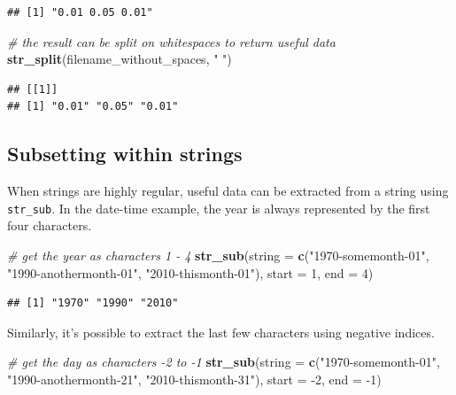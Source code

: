 \documentclass[]{book}
\newenvironment{Shaded}{}{}
\newcommand{\CommentTok}[1]{\textcolor[rgb]{0.38,0.63,0.69}{\textit{#1}}}
\newcommand{\DataTypeTok}[1]{\textcolor[rgb]{0.56,0.13,0.00}{#1}}
\newcommand{\DecValTok}[1]{\textcolor[rgb]{0.25,0.63,0.44}{#1}}
\newcommand{\KeywordTok}[1]{\textcolor[rgb]{0.00,0.44,0.13}{\textbf{#1}}}
\newcommand{\NormalTok}[1]{#1}
\newcommand{\StringTok}[1]{\textcolor[rgb]{0.25,0.44,0.63}{#1}}
\begin{document}
\begin{verbatim}
## [1] "0.01 0.05 0.01"
\end{verbatim}

\begin{Shaded}
\begin{Highlighting}[]
\CommentTok{# the result can be split on whitespaces to return useful data}
\KeywordTok{str_split}\NormalTok{(filename_without_spaces, }\StringTok{" "}\NormalTok{)}
\end{Highlighting}
\end{Shaded}

\begin{verbatim}
## [[1]]
## [1] "0.01" "0.05" "0.01"
\end{verbatim}

\hypertarget{subsetting-within-strings}{%
\subsection{Subsetting within strings}\label{subsetting-within-strings}}

When strings are highly regular, useful data can be extracted from a string using \texttt{str\_sub}. In the date-time example, the year is always represented by the first four characters.

\begin{Shaded}
\begin{Highlighting}[]
\CommentTok{# get the year as characters 1 - 4}
\KeywordTok{str_sub}\NormalTok{(}\DataTypeTok{string =} \KeywordTok{c}\NormalTok{(}\StringTok{"1970-somemonth-01"}\NormalTok{,}
                     \StringTok{"1990-anothermonth-01"}\NormalTok{,}
                     \StringTok{"2010-thismonth-01"}\NormalTok{), }
        \DataTypeTok{start =} \DecValTok{1}\NormalTok{, }\DataTypeTok{end =} \DecValTok{4}\NormalTok{)}
\end{Highlighting}
\end{Shaded}

\begin{verbatim}
## [1] "1970" "1990" "2010"
\end{verbatim}

Similarly, it's possible to extract the last few characters using negative indices.

\begin{Shaded}
\begin{Highlighting}[]
\CommentTok{# get the day as characters -2 to -1}
\KeywordTok{str_sub}\NormalTok{(}\DataTypeTok{string =} \KeywordTok{c}\NormalTok{(}\StringTok{"1970-somemonth-01"}\NormalTok{,}
                     \StringTok{"1990-anothermonth-21"}\NormalTok{,}
                     \StringTok{"2010-thismonth-31"}\NormalTok{), }
        \DataTypeTok{start =} \DecValTok{-2}\NormalTok{, }\DataTypeTok{end =} \DecValTok{-1}\NormalTok{)}
\end{Highlighting}
\end{Shaded}
\end{document}
